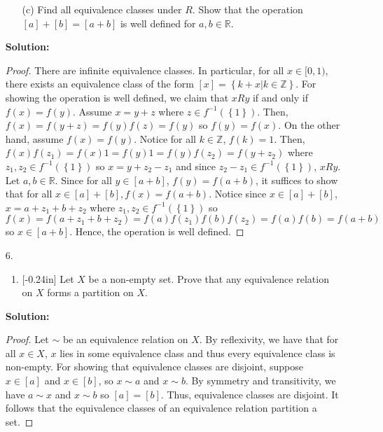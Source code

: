 \documentclass[letterpaper,12pt]{article}
\newcommand{\set}[1]{\left\{ #1 \right\}}
\theoremstyle{definition}
\begin{document}
\begin{enumerate}
    \item[] \begin{enumerate}
        \item[(c)] Find all equivalence classes under $R$. Show that the operation $[a] + [b] = [a+b]$ is well defined for $a,b \in \mathbb{R}$. 
    \end{enumerate}
     \begin{mdframed}
            \textbf{Solution:}
            \begin{proof}
            There are infinite equivalence classes. In particular, for all $x \in [0,1)$, there exists an equivalence class of the form $[x] = \set{k + x | k \in \mathbb{Z}}$. For showing the operation is well defined, we claim that $x Ry$ if and only if $f(x) = f(y)$. Assume $x = y + z$ where $z \in f^{-1}(\set{1})$. Then, $f(x) = f(y+z) = f(y)f(z) = f(y)$ so $f(y) = f(x)$. On the other hand, assume $f(x) = f(y)$. Notice for all $k \in \mathbb{Z}$, $f(k) = 1$. Then, $f(x)f(z_1) = f(x)1 = f(y)1 = f(y)f(z_2) = f(y+z_2)$ where $z_1,z_2 \in f^{-1}(\set{1})$ so $x = y + z_2 - z_1$ and since $z_2-z_1 \in f^{-1}(\set{1})$, $x R y$. Let $a, b \in \mathbb{R}$. Since for all $y \in [a+b]$, $f(y) = f(a+b)$, it suffices to show that for all $x \in [a] + [b], f(x) = f(a+b)$. Notice since $x \in [a] + [b]$, $x = a + z_1 + b + z_2$ where $z_1,z_2 \in f^{-1}(\set{1})$ so $f(x) = f(a+z_1+b+z_2) = f(a)f(z_1)f(b)f(z_2) = f(a)f(b) = f(a+b)$ so $x \in [a+b]$. Hence, the operation is well defined.
            
        \end{proof}
        \end{mdframed}
\end{enumerate}
\pagebreak
\begin{enumerate}
    \item[6.]  \begin{enumerate}
    \item \reversemarginpar{}[-0.24in] 
Let $X$ be a non-empty set. Prove that any equivalence relation on $X$ forms a partition on $X$.
\end{enumerate}
 \begin{mdframed}
            \textbf{Solution:}
            \begin{proof}
               Let $\sim$ be an equivalence relation on $X$. By reflexivity, we have that for all $x \in X$, $x$ lies in some equivalence class and thus every equivalence class is non-empty. For showing that equivalence classes are disjoint, suppose $x \in [a]$ and $x \in [b]$, so $x \sim a$ and $x \sim b$. By symmetry and transitivity, we have $a \sim x$ and $x \sim b$ so $[a] = [b]$. Thus, equivalence classes are disjoint. It follows that the equivalence classes of an equivalence relation partition a set.
            \end{proof}
        \end{mdframed}
\end{enumerate}
\end{document}
